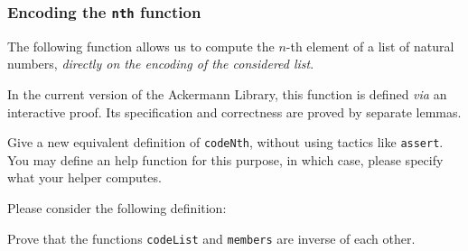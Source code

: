   \subsubsection{Encoding the \texttt{nth} function}

  The following function allows us to compute the $n$-th element of a list of natural numbers, \emph{directly on the encoding of the considered list}.

  In the current version of the Ackermann Library, this function is defined \emph{via} an interactive proof. Its specification and
  correctness are proved by  separate lemmas. 
  


  \begin{exercise}
  Give a new equivalent definition of \texttt{codeNth}, without using tactics like \texttt{assert}.  You may define an help function for this purpose, in which case, please specify what your helper computes.
  \end{exercise}

  \begin{exercise}
    Please consider the following definition:

    

   

    Prove that the functions \texttt{codeList} and \texttt{members} are inverse of each other.
  \end{exercise}


  

       